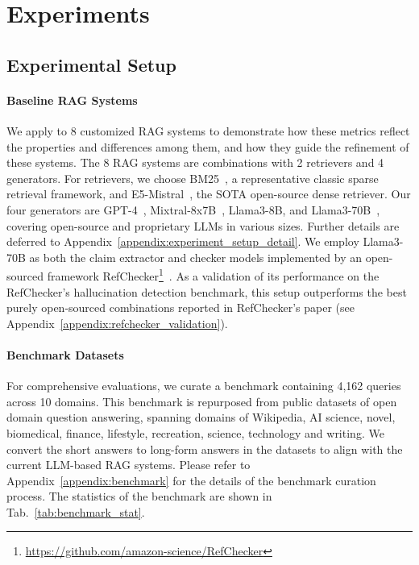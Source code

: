 \section{Experiments}
\subsection{Experimental Setup}
\label{sec:baseline_rag_systems}
\paragraph{Baseline RAG Systems}
We apply \benchname\space to 8 customized RAG systems to demonstrate how these metrics reflect the properties and differences among them, and how they guide the refinement of these systems. The 8 RAG systems are combinations with 2 retrievers and 4 generators. For retrievers, we choose BM25~\cite{robertson2009probabilistic}, a representative classic sparse retrieval framework, and E5-Mistral~\cite{wang2023improving}, the SOTA open-source dense retriever. Our four generators are GPT-4~\cite{openai2023gpt4}, Mixtral-8x7B~\cite{jiang2024mixtral}, Llama3-8B, and Llama3-70B~\cite{llama3modelcard}, covering open-source and proprietary LLMs in various sizes. Further details are deferred to Appendix~\ref{appendix:experiment_setup_detail}. 
We employ Llama3-70B as both the claim extractor and checker models implemented by an open-sourced framework RefChecker\footnote{\url{https://github.com/amazon-science/RefChecker}}~\cite{hu2024refchecker}. As a validation of its performance on the RefChecker's hallucination detection benchmark, this setup outperforms the best purely open-sourced combinations reported in RefChecker's paper (see Appendix~\ref{appendix:refchecker_validation}).

\paragraph{Benchmark Datasets}

For comprehensive evaluations, we curate a benchmark containing 4,162 queries across 10 domains. This benchmark is repurposed from public datasets of open domain question answering, spanning domains of Wikipedia, AI science, novel, biomedical, finance, lifestyle, recreation, science, technology and writing. We convert the short answers to long-form answers in the datasets to align with the current LLM-based RAG systems. Please refer to Appendix~\ref{appendix:benchmark} for the details of the benchmark curation process. The statistics of the benchmark are shown in Tab.~\ref{tab:benchmark_stat}.


